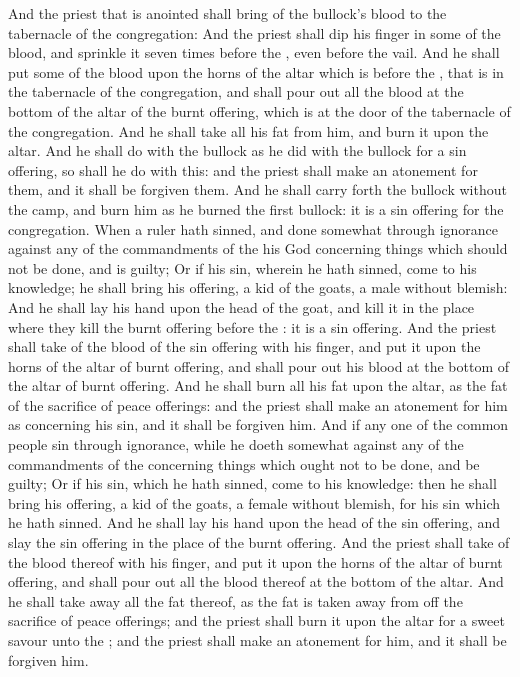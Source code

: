 \begin{biblechapter}
\verse And the priest that is anointed shall bring of the bullock's blood to the tabernacle of the congregation:
\verse And the priest shall dip his finger in some of the blood, and sprinkle it seven times before the \LORD, even before the vail.
\verse And he shall put some of the blood upon the horns of the altar which is before the \LORD, that is in the tabernacle of the congregation, and shall pour out all the blood at the bottom of the altar of the burnt offering, which is at the door of the tabernacle of the congregation.
\verse And he shall take all his fat from him, and burn it upon the altar.
\verse And he shall do with the bullock as he did with the bullock for a sin offering, so shall he do with this: and the priest shall make an atonement for them, and it shall be forgiven them.
\verse And he shall carry forth the bullock without the camp, and burn him as he burned the first bullock: it is a sin offering for the congregation.
\verse When a ruler hath sinned, and done somewhat through ignorance against any of the commandments of the \LORD his God concerning things which should not be done, and is guilty;
\verse Or if his sin, wherein he hath sinned, come to his knowledge; he shall bring his offering, a kid of the goats, a male without blemish:
\verse And he shall lay his hand upon the head of the goat, and kill it in the place where they kill the burnt offering before the \LORD: it is a sin offering.
\verse And the priest shall take of the blood of the sin offering with his finger, and put it upon the horns of the altar of burnt offering, and shall pour out his blood at the bottom of the altar of burnt offering.
\verse And he shall burn all his fat upon the altar, as the fat of the sacrifice of peace offerings: and the priest shall make an atonement for him as concerning his sin, and it shall be forgiven him.
\verse And if any one of the common people sin through ignorance, while he doeth somewhat against any of the commandments of the \LORD concerning things which ought not to be done, and be guilty;
\verse Or if his sin, which he hath sinned, come to his knowledge: then he shall bring his offering, a kid of the goats, a female without blemish, for his sin which he hath sinned.
\verse And he shall lay his hand upon the head of the sin offering, and slay the sin offering in the place of the burnt offering.
\verse And the priest shall take of the blood thereof with his finger, and put it upon the horns of the altar of burnt offering, and shall pour out all the blood thereof at the bottom of the altar.
\verse And he shall take away all the fat thereof, as the fat is taken away from off the sacrifice of peace offerings; and the priest shall burn it upon the altar for a sweet savour unto the \LORD; and the priest shall make an atonement for him, and it shall be forgiven him.

\end{biblechapter}
